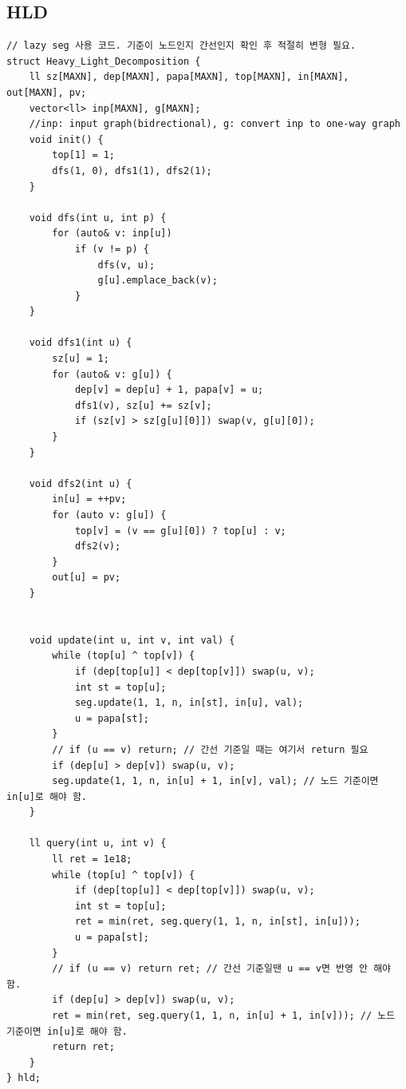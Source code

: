 \documentclass[landscape, 8pt, a4paper, oneside, twocolumn]{extarticle}
\begin{document}
\subsection {HLD}
\begin{verbatim}
// lazy seg 사용 코드. 기준이 노드인지 간선인지 확인 후 적절히 변형 필요.
struct Heavy_Light_Decomposition {
    ll sz[MAXN], dep[MAXN], papa[MAXN], top[MAXN], in[MAXN], out[MAXN], pv;
    vector<ll> inp[MAXN], g[MAXN];
    //inp: input graph(bidrectional), g: convert inp to one-way graph
    void init() {
        top[1] = 1;
        dfs(1, 0), dfs1(1), dfs2(1);
    }

    void dfs(int u, int p) {
        for (auto& v: inp[u])
            if (v != p) {
                dfs(v, u);
                g[u].emplace_back(v);
            }
    }

    void dfs1(int u) {
        sz[u] = 1;
        for (auto& v: g[u]) {
            dep[v] = dep[u] + 1, papa[v] = u;
            dfs1(v), sz[u] += sz[v];
            if (sz[v] > sz[g[u][0]]) swap(v, g[u][0]);
        }
    }

    void dfs2(int u) {
        in[u] = ++pv;
        for (auto v: g[u]) {
            top[v] = (v == g[u][0]) ? top[u] : v;
            dfs2(v);
        }
        out[u] = pv;
    }


    void update(int u, int v, int val) {
        while (top[u] ^ top[v]) {
            if (dep[top[u]] < dep[top[v]]) swap(u, v);
            int st = top[u];
            seg.update(1, 1, n, in[st], in[u], val);
            u = papa[st];
        }
        // if (u == v) return; // 간선 기준일 때는 여기서 return 필요
        if (dep[u] > dep[v]) swap(u, v);
        seg.update(1, 1, n, in[u] + 1, in[v], val); // 노드 기준이면 in[u]로 해야 함.
    }

    ll query(int u, int v) {
        ll ret = 1e18;
        while (top[u] ^ top[v]) {
            if (dep[top[u]] < dep[top[v]]) swap(u, v);
            int st = top[u];
            ret = min(ret, seg.query(1, 1, n, in[st], in[u]));
            u = papa[st];
        }
        // if (u == v) return ret; // 간선 기준일땐 u == v면 반영 안 해야 함.
        if (dep[u] > dep[v]) swap(u, v);
        ret = min(ret, seg.query(1, 1, n, in[u] + 1, in[v])); // 노드 기준이면 in[u]로 해야 함.
        return ret;
    }
} hld;
\end{verbatim}
\end{document}

